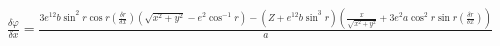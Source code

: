 \documentclass{standalone}
\begin{document}
    $\frac{\delta \varphi}{\delta x} = \frac{ 3e^{12} b{\sin^2 r}{\cos r} (\frac{\delta r}{\delta x})(\sqrt{x^2+y^2} -
    e^2 {\cos^{-1} r}) - (Z + e^{12}b{\sin^3 r}) (\frac{x}{\sqrt{x^2+y^2}} + 3e^2 a {\cos^2 r}{\sin r} (\frac{\delta r}{\delta x}) ) }{a}$
\end{document}
